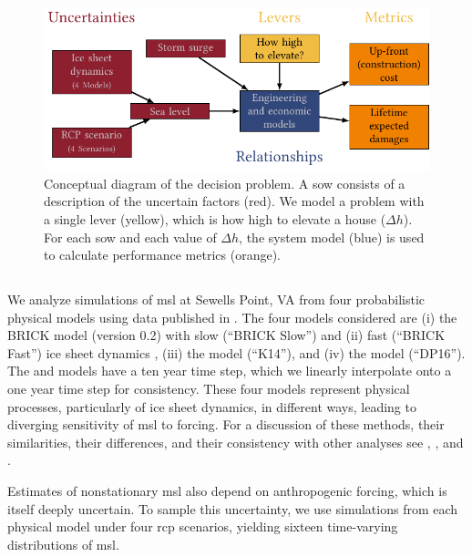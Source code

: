 \documentclass[11pt]{article}
\begin{document}
\begin{figure}
    \centering
    \includegraphics[width=\textwidth]{xlrm.pdf}
    \caption{
        Conceptual diagram of the decision problem.
        A \gls{sow} consists of a description of the uncertain factors (red).
        We model a problem with a single lever (yellow), which is how high to elevate a house ($\Delta h$).
        For each \acrshort{sow} and each value of $\Delta h$, the system model (blue) is used to calculate performance metrics (orange).
    }\label{fig:xlrm}
\end{figure}

\subsection{}\label{sec:case-slr}

We analyze simulations of \gls{msl} at Sewells Point, VA from four probabilistic physical models using data published in \citet{ruckert_coastal:2019}.
The four models considered are (i) the BRICK model (version 0.2) with slow (``BRICK Slow'') and (ii) fast (``BRICK Fast'') ice sheet dynamics \citep{wong_brick0.2:2017}, (iii) the \citet{kopp_probabilistic:2014} model (``K14''), and (iv) the \citet{deconto_antarctica:2016} model (``DP16'').
The \citet{kopp_probabilistic:2014} and \citet{deconto_antarctica:2016} models have a ten year time step, which we linearly interpolate onto a one year time step for consistency.
These four models represent physical processes, particularly of ice sheet dynamics, in different ways, leading to diverging sensitivity of \gls{msl} to forcing.
For a discussion of these methods, their similarities, their differences, and their consistency with other analyses see \citet{ruckert_coastal:2019}, \citet{kopp_evolving:2017}, and \citet{bamber_slrise:2019}.

Estimates of nonstationary \gls{msl} also depend on anthropogenic forcing, which is itself deeply uncertain.
To sample this uncertainty, we use simulations from each physical model under four \gls{rcp} scenarios, yielding sixteen time-varying distributions of \gls{msl}.
\end{document}
